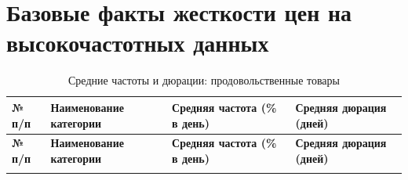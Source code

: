 \noindent
{}


\section{Базовые факты жесткости цен на высокочастотных данных}\label{app:A2}

\begin{longtable}{|p{1cm}|p{8.5cm}|p{3.5cm}|p{3cm}|} %
	\caption{Средние частоты и дюрации: продовольственные товары} \label{tab:products} \\
	\hline
	\textbf{№ п/п} & \textbf{Наименование категории} & \textbf{Средняя частота (\% в день)} & \textbf{Средняя дюрация (дней)} \\
	\hline
	\hline
	\endfirsthead
	
	\hline
	\textbf{№ п/п} & \textbf{Наименование категории} & \textbf{Средняя частота (\% в день)} & \textbf{Средняя дюрация (дней)} \\
	\hline
	\hline
	\endhead
	
	\hline
	\endfoot
	
	\hline
	\endlastfoot
	

\end{longtable}
